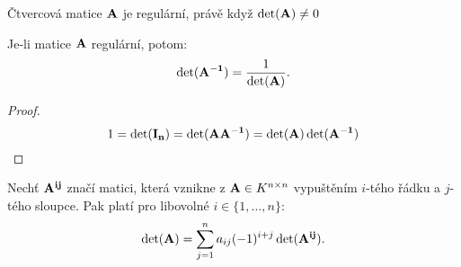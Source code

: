 \begin{theorem}
    Čtvercová matice $\mathbf{A}$ je regulární, právě když $\det(\mathbf{A}) \neq 0$
\end{theorem}

\begin{corollary}
    \label{cor:detai}
    Je-li matice $\mathbf{A}$ regulární, potom:
    $$\det(\mathbf{A^{-1}}) = \frac{1}{\det(\mathbf{A})}.$$
\end{corollary}

\begin{proof}
     $$1 = \det(\mathbf{I_{n}}) = \det(\mathbf{A} \mathbf{A^{-1}}) = \det(\mathbf{A})\det(\mathbf{A^{-1}})$$
\end{proof}

\begin{observation}
    \label{obs:rozvojdet}
    Nechť $\mathbf{A^{ij}}$ značí matici, která vznikne z 
    $\mathbf{A} \in K^{n \times n}$ vypuštěním $i$-tého řádku a $j$-tého sloupce.
    Pak platí pro libovolné $i \in \{1, \dots, n\}$:
    $$\det(\mathbf{A}) = \sum_{j=1}^n a_{ij} (-1)^{i+j} \det(\mathbf{A^{ij}}).$$
\end{observation}

